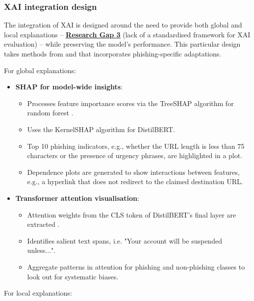 
\subsubsection*{XAI integration design}
The integration of XAI is designed around the need to provide both global and local explanations -- \hyperref[research-gap-3]{\uline{\textbf{Research Gap 3}}} (lack of a standardised framework for XAI evaluation) -- while preserving the model's performance. This particular design takes methods from \cite{ribeiro2016model} and \cite{shendkar2024enhancing} that incorporates phishing-specific adaptations.\newline

\noindent For global explanations:

\begin{itemize}
  \item \textbf{SHAP for model-wide insights}:
  \begin{itemize}
    \item Processes feature importance scores via the TreeSHAP algorithm for random forest \citep{lundberg2017unified}.
    \item Uses the KernelSHAP algorithm for DistilBERT.
    \item Top 10 phishing indicators, e.g., whether the URL length is less than 75 characters or the presence of urgency phrases, are highlighted in a plot. 
    \item Dependence plots are generated to show interactions between features, e.g., a hyperlink that does not redirect to the claimed destination URL.
  \end{itemize}
  \item \textbf{Transformer attention visualisation}:
  \begin{itemize}
    \item Attention weights from the CLS token of DistilBERT's final layer are extracted \citep{vo2024securing}.
    \item Identifies salient text spans, i.e. "Your account will be suspended unless...".
    \item Aggregate patterns in attention for phishing and non-phishing classes to look out for systematic biases.
  \end{itemize}
\end{itemize}

\noindent For local explanations:

